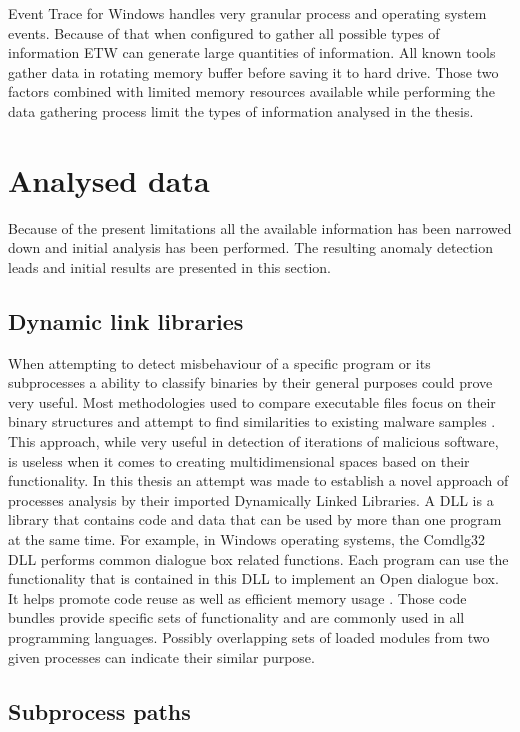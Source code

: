 \documentclass[a4paper,twoside,12pt]{book}
\begin{document}
Event Trace for Windows handles very granular process and operating system events.
Because of that when configured to gather all possible types of information ETW can generate
large quantities of information. All known tools gather data in rotating memory buffer 
before saving it to hard drive. Those two factors combined with limited memory resources 
available while performing the data gathering process limit the types of information analysed 
in the thesis. 

\section{Analysed data}

Because of the present limitations all the available information has been narrowed down and 
initial analysis has been performed. The resulting anomaly detection leads and initial 
results are presented in this section.

\subsection{Dynamic link libraries}

When attempting to detect misbehaviour of a specific program or its subprocesses a ability to 
classify binaries by their general purposes could prove very useful. Most methodologies used to 
compare executable files focus on their binary structures and attempt to find similarities to 
existing malware samples \cite{bib:malwclass}. This approach, while very useful in detection of 
iterations of malicious software, is useless when it comes to creating multidimensional spaces 
based on their functionality. In this thesis an attempt was made to establish a novel approach of 
processes analysis by their imported Dynamically Linked Libraries. A DLL is a library that 
contains code and data that can be used by more than one program at the same time. For example, 
in Windows operating systems, the Comdlg32 DLL performs common dialogue box related functions. Each 
program can use the functionality that is contained in this DLL to implement an Open dialogue box. 
It helps promote code reuse as well as efficient memory usage \cite{bib:dll}. Those code bundles provide 
specific sets of functionality and are commonly used in all programming languages. Possibly 
overlapping sets of loaded modules from two given processes can indicate their similar purpose. 

\subsection{Subprocess paths}
\end{document}
